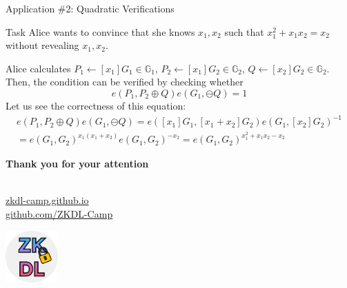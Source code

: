 \documentclass{zkdl-presentation-template}
\begin{document}
    \begin{frame}{Application \#2: Quadratic Verifications}
        \begin{block}{Task}
            Alice wants to convince that she knows $x_1,x_2$ such that $x_1^2+x_1x_2=x_2$ without revealing $x_1,x_2$.
        \end{block}

        \begin{example}
            Alice calculates $P_1 \gets [x_1]G_1 \in \mathbb{G}_1$, $P_2 \gets [x_1]G_2 \in \mathbb{G}_2$, $Q \gets [x_2]G_2 \in \mathbb{G}_2$. Then, the condition can be verified by checking whether
            \begin{equation*}
                e(P_1,P_2\oplus Q)e(G_1,\ominus Q) = 1
            \end{equation*}
             Let us see the correctness of this equation:
            \begin{gather*}
                e(P_1,P_2\oplus Q)e(G_1,\ominus Q) = e([x_1]G_1,[x_1+x_2]G_2)e(G_1,[x_2]G_2)^{-1} \nonumber \\= e(G_1,G_2)^{x_1(x_1+x_2)}e(G_1,G_2)^{-x_2} = e(G_1,G_2)^{x_1^2+x_1x_2-x_2}
            \end{gather*}
        \end{example}
    \end{frame}
    
    \begin{frame}
        \centering
        \LARGE
        \textbf{Thank you for your attention} \\
        
        \vspace{0.2cm} \Huge {} \large \\
        
        \vspace{1cm}
  
        \href{https://zkdl-camp.github.io/}{\hspace{.325em}zkdl-camp.github.io} \\
  
        \href{https://github.com/ZKDL-Camp}{\hspace{.325em}github.com/ZKDL-Camp}
        
        \begin{center}
            \includegraphics[width=0.15\textwidth]{images/logo.png}
        \end{center}
    \end{frame}
\end{document}
